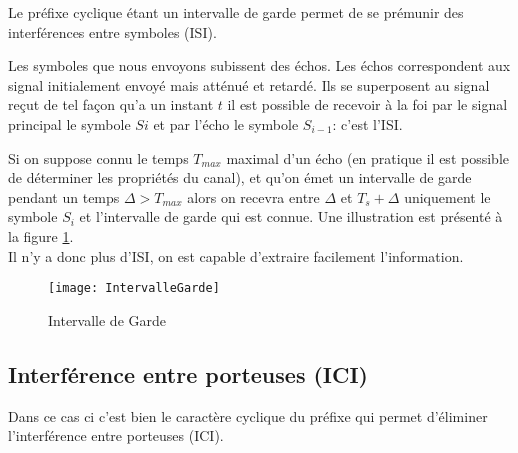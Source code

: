 Le préfixe cyclique étant un intervalle de garde permet de se prémunir des
interférences entre symboles (ISI).

Les symboles que nous envoyons subissent des échos. Les échos correspondent aux
signal initialement envoyé mais atténué et retardé. Ils se superposent au signal
reçut de tel façon qu'a un instant $t$ il est possible de recevoir à la foi par le
signal principal le symbole $Si$ et par l'écho le symbole $S_{i-1}$: c'est l'ISI.

Si on suppose connu le temps $T_{max}$ maximal d'un écho (en pratique il est possible de
déterminer les propriétés du canal), et qu'on émet un intervalle de garde
pendant un temps $\Delta > T_{max}$ alors on recevra entre $\Delta$ et
$T_s+\Delta$ uniquement le symbole $S_i$ et l'intervalle de garde qui est
connue. Une illustration est présenté à la figure \ref{fig:intervalleGarde}.
~\\

Il n'y a donc plus d'ISI, on est capable d'extraire facilement l'information.


\begin{figure}[!h]
  \centering
  \texttt{[image: IntervalleGarde]}
  \caption{Intervalle de Garde}
  \label{fig:intervalleGarde}
\end{figure}

\subsection{Interférence entre porteuses (ICI)}


Dans ce cas ci c'est bien le caractère cyclique du préfixe qui permet d'éliminer
l'interférence entre porteuses (ICI).



